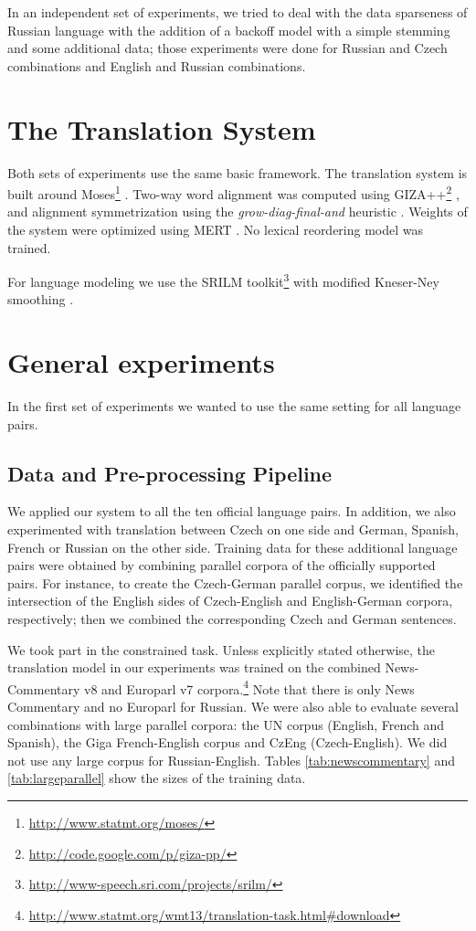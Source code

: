 \documentclass[11pt,letterpaper]{article}
\def\parcite#1{\cite{#1}}  %
\def\parcite#1{\cite{#1}}
\begin{document}
In an independent set of experiments, we tried to deal with the data sparseness of Russian language with the addition of a backoff model with a simple stemming and some additional data; those experiments were done for Russian and Czech combinations and English and Russian combinations.


\section{The Translation System}
\label{sec:system}

Both sets of experiments use the same basic framework. The translation system is built around Moses\footnote{\url{http://www.statmt.org/moses/}} \parcite{moses}. Two-way word alignment was computed using GIZA++\footnote{\url{http://code.google.com/p/giza-pp/}} \parcite{giza}, and alignment symmetrization using the \textit{grow-diag-final-and} heuristic \parcite{grow-diag-final-and}. Weights of the system were optimized using MERT \parcite{mert}. No lexical reordering model was trained.

For language modeling we use the SRILM toolkit\footnote{\url{http://www-speech.sri.com/projects/srilm/}} \parcite{srilm} with modified Kneser-Ney smoothing \parcite{kneser-ney,modified-kneser-ney}.

\section{General experiments}
In the first set of experiments we wanted to use the same setting for all language pairs.

\subsection{Data and Pre-processing Pipeline}

We applied our system to all the ten official language pairs. In addition, we also experimented with translation between Czech on one side and German, Spanish, French or Russian on the other side. Training data for these additional language pairs were obtained by combining parallel corpora of the officially supported pairs. For instance, to create the Czech-German parallel corpus, we identified the intersection of the English sides of Czech-English and English-German corpora, respectively; then we combined the corresponding Czech and German sentences.

We took part in the constrained task. Unless explicitly stated otherwise, the translation model in our experiments was trained on the combined News-Commentary v8 and Europarl v7 corpora.\footnote{\url{http://www.statmt.org/wmt13/translation-task.html\#download}}
Note that there is only News Commentary and no Europarl for Russian.
We were also able to evaluate several combinations with large parallel corpora:
the UN corpus (English, French and Spanish), the Giga French-English corpus and CzEng
(Czech-English). We did not use any large corpus for Russian-English.
Tables \ref{tab:newscommentary} and \ref{tab:largeparallel} show the sizes of the training data.
\end{document}
